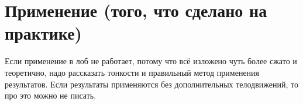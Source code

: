
\section{Применение (того, что сделано на практике)}

Если применение в лоб не работает, потому что всё изложено чуть более сжато и теоретично, надо рассказать тонкости и правильный метод применения результатов. Если результаты применяются без до\-полнительных телодвижений, то про это можно не писать.
